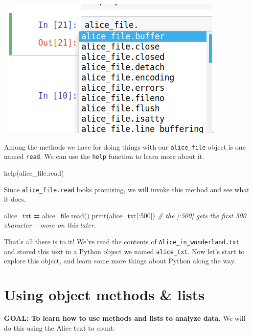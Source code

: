 \documentclass[]{book}
\newenvironment{Shaded}{\begin{snugshade}}{\end{snugshade}}
\newcommand{\DecValTok}[1]{\textcolor[rgb]{0.00,0.00,0.81}{#1}}
\newcommand{\CommentTok}[1]{\textcolor[rgb]{0.56,0.35,0.01}{\textit{#1}}}
\newcommand{\OperatorTok}[1]{\textcolor[rgb]{0.81,0.36,0.00}{\textbf{#1}}}
\newcommand{\BuiltInTok}[1]{#1}
\newcommand{\NormalTok}[1]{#1}
\begin{document}
\includegraphics{Python/PythonIntro/images/notebook_file_completion.png}.

Among the methods we have for doing things with our \texttt{alice\_file}
object is one named \texttt{read}. We can use the \texttt{help} function
to learn more about it.

\begin{Shaded}
\begin{Highlighting}[]
\BuiltInTok{help}\NormalTok{(alice_file.read)}
\end{Highlighting}
\end{Shaded}

Since \texttt{alice\_file.read} looks promising, we will invoke this
method and see what it does.

\begin{Shaded}
\begin{Highlighting}[]
\NormalTok{alice_txt }\OperatorTok{=}\NormalTok{ alice_file.read()}
\BuiltInTok{print}\NormalTok{(alice_txt[:}\DecValTok{500}\NormalTok{]) }\CommentTok{# the [:500] gets the first 500 character -- more on this later.}
\end{Highlighting}
\end{Shaded}

That's all there is to it! We've read the contents of
\texttt{Alice\_in\_wonderland.txt} and stored this text in a Python
object we named \texttt{alice\_txt}. Now let's start to explore this
object, and learn some more things about Python along the way.

\section{Using object methods \&
lists}\label{using-object-methods-lists}

\textbf{GOAL: To learn how to use methods and lists to analyze data.} We
will do this using the Alice text to count:
\end{document}
